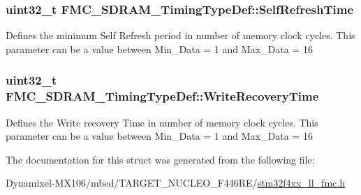\subsubsection[{\texorpdfstring{Self\+Refresh\+Time}{SelfRefreshTime}}]{\setlength{\rightskip}{0pt plus 5cm}uint32\+\_\+t F\+M\+C\+\_\+\+S\+D\+R\+A\+M\+\_\+\+Timing\+Type\+Def\+::\+Self\+Refresh\+Time}\hypertarget{struct_f_m_c___s_d_r_a_m___timing_type_def_a8847315f4ac89d7278021ca07281f6f1}{}\label{struct_f_m_c___s_d_r_a_m___timing_type_def_a8847315f4ac89d7278021ca07281f6f1}
Defines the minimum Self Refresh period in number of memory clock cycles. This parameter can be a value between Min\+\_\+\+Data = 1 and Max\+\_\+\+Data = 16 
\subsubsection[{\texorpdfstring{Write\+Recovery\+Time}{WriteRecoveryTime}}]{\setlength{\rightskip}{0pt plus 5cm}uint32\+\_\+t F\+M\+C\+\_\+\+S\+D\+R\+A\+M\+\_\+\+Timing\+Type\+Def\+::\+Write\+Recovery\+Time}\hypertarget{struct_f_m_c___s_d_r_a_m___timing_type_def_a9b4e896e7795ac9a32339a0e6520975e}{}\label{struct_f_m_c___s_d_r_a_m___timing_type_def_a9b4e896e7795ac9a32339a0e6520975e}
Defines the Write recovery Time in number of memory clock cycles. This parameter can be a value between Min\+\_\+\+Data = 1 and Max\+\_\+\+Data = 16 

The documentation for this struct was generated from the following file\+:\begin{DoxyCompactItemize}
\item 
Dynamixel-\/\+M\+X106/mbed/\+T\+A\+R\+G\+E\+T\+\_\+\+N\+U\+C\+L\+E\+O\+\_\+\+F446\+R\+E/\hyperlink{stm32f4xx__ll__fmc_8h}{stm32f4xx\+\_\+ll\+\_\+fmc.\+h}\end{DoxyCompactItemize}
